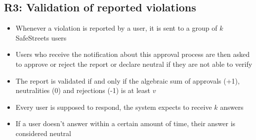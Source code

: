\subsection{R3: Validation of reported violations}
\begin{itemize}
    \item Whenever a violation is reported by a user, it is sent to a group of $k$ SafeStreets users
    \item Users who receive the notification about this approval process are then asked to approve or reject the report or declare neutral if they are not able to verify
    \item The report is validated if and only if the algebraic sum of approvals (+1), neutralities (0) and rejections (-1) is at least $v$
    \item Every user is supposed to respond, the system expects to receive $k$ answers
    \item If a user doesn't answer within a certain amount of time, their answer is considered neutral
\end{itemize}
